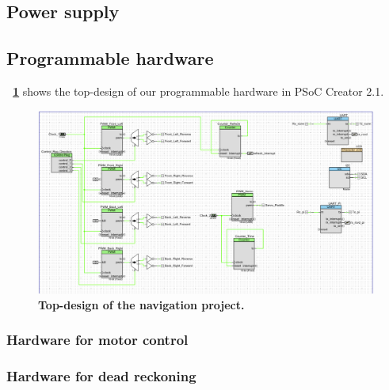 \documentclass[letterpaper, 11pt]{article}
\newcommand*{\figref}[1]{\textbf{\figurename~\ref{#1}}}
\begin{document}
\begin{enumerate}[label=\textbf{\arabic*.}]
\subsection{Power supply}
\label{sec:power}

\subsection{Programmable hardware}
\figref{fig:topdesign} shows the top-design of our programmable hardware in PSoC Creator 2.1.
\begin{figure}[ht]
    \centering
    \includegraphics[height=0.99\textwidth,
                     angle=-90, origin=c,
                     trim=1.2in 1in 1.8in 1in, clip]{images/topdesign.pdf}
    \vspace*{-3cm}
    \caption{\textbf{Top-design of the navigation project.}}
    \label{fig:topdesign}
\end{figure}

\subsubsection{Hardware for motor control}

\subsubsection{Hardware for dead reckoning}


\end{enumerate}
\end{document}

